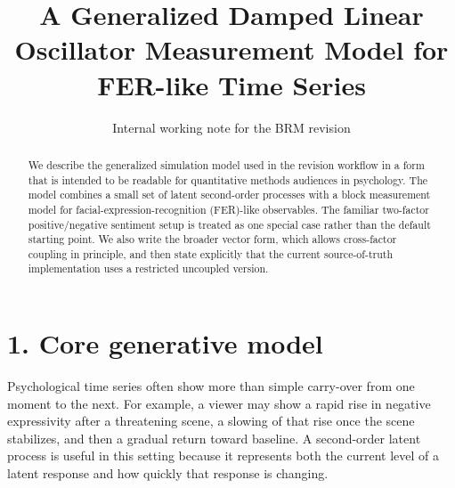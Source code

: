 \documentclass[10pt]{article}
\title{A Generalized Damped Linear Oscillator Measurement Model for FER-like Time Series}
\author{Internal working note for the BRM revision}
\date{}
\begin{document}
\maketitle
\vspace{-3.2em}

\begin{abstract}
We describe the generalized simulation model used in the revision workflow in a form that is intended to be readable for quantitative methods audiences in psychology. The model combines a small set of latent second-order processes with a block measurement model for facial-expression-recognition (FER)-like observables. The familiar two-factor positive/negative sentiment setup is treated as one special case rather than the default starting point. We also write the broader vector form, which allows cross-factor coupling in principle, and then state explicitly that the current source-of-truth implementation uses a restricted uncoupled version.
\end{abstract}

\section*{1. Core generative model}
Psychological time series often show more than simple carry-over from one moment to the next. For example, a viewer may show a rapid rise in negative expressivity after a threatening scene, a slowing of that rise once the scene stabilizes, and then a gradual return toward baseline. A second-order latent process is useful in this setting because it represents both the current level of a latent response and how quickly that response is changing.
\end{document}
